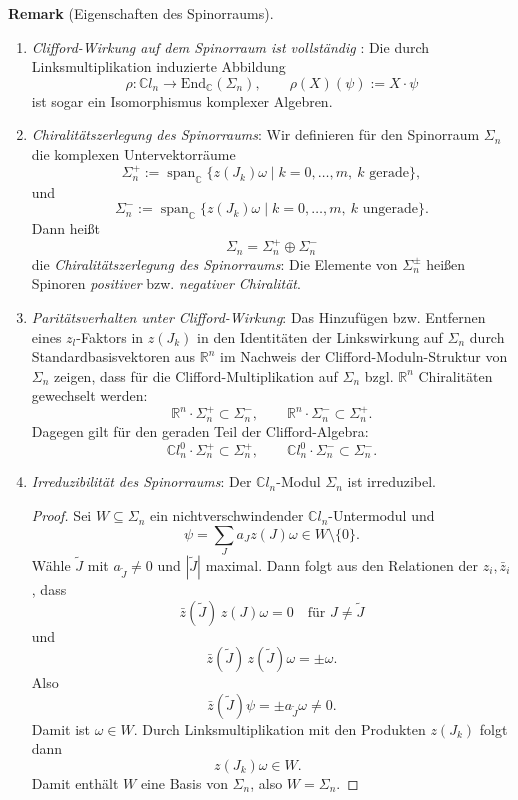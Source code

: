 \documentclass[10pt, letterpaper]{article}
\newcommand{\R}{\mathbb{R}}
\newcommand{\C}{\mathbb{C}}
\newcommand{\End}{\mathrm{End}}
\newcommand{\CustomHeading}[3]{%
  \par\medskip\noindent%
  \textbf{#1 #2} \textnormal{(#3)}.\enskip%
}
\newenvironment{REM}[2]{\CustomHeading{Remark}{#1}{#2}}{}
\begin{document}
\begin{REM}{}{Eigenschaften des Spinorraums}
\begin{enumerate}
    \item \emph{Clifford-Wirkung auf dem Spinorraum ist vollständig} \parencite[90]{BaerSpin}:
    Die durch Linksmultiplikation induzierte Abbildung
    \[
    \rho:\C l_n\longrightarrow \End_{\C}(\Sigma_n),\qquad
    \rho(X)(\psi):=X\cdot \psi
    \]
    ist sogar ein Isomorphismus komplexer Algebren.
    \item \emph{Chiralitätszerlegung des Spinorraums}:
    Wir definieren für den Spinorraum $\Sigma_n$ die komplexen Untervektorräume
    \[\Sigma_n^{+}:=\operatorname{span}_{\C}\{z(J_k)\omega\mid k=0,\dots,m,\ k \text{ gerade}\},\]
    und
    \[\Sigma_n^{-}:=\operatorname{span}_{\C}\{z(J_k)\omega\mid k=0,\dots,m,\ k \text{ ungerade}\}.\]
    Dann heißt
    \[\Sigma_n=\Sigma_n^{+}\oplus \Sigma_n^{-}\]
    die \emph{Chiralitätszerlegung des Spinorraums}: Die Elemente von $\Sigma_n^\pm$
    heißen Spinoren \emph{positiver} bzw. \emph{negativer Chiralität}.
    \item \emph{Paritätsverhalten unter Clifford-Wirkung}:
    Das Hinzufügen bzw. Entfernen eines $z_l$-Faktors in $z(J_k)$ in den Identitäten der Linkswirkung auf $\Sigma_n$ durch Standardbasisvektoren aus $\R^n$ im Nachweis der Clifford-Moduln-Struktur von $\Sigma_n$ zeigen, dass für die Clifford-Multiplikation auf $\Sigma_n$ bzgl. $\R^n$ Chiralitäten gewechselt werden:
    \[
    \R^n\cdot \Sigma_n^+ \subset \Sigma_n^-,
    \qquad
    \R^n\cdot \Sigma_n^- \subset \Sigma_n^+.
    \]
    Dagegen gilt für den geraden Teil der Clifford-Algebra:
    \[
    \C l_n^0\cdot \Sigma_n^+ \subset \Sigma_n^+,
    \qquad
    \C l_n^0\cdot \Sigma_n^- \subset \Sigma_n^-.
    \]
    \item \emph{Irreduzibilität des Spinorraums}:
    Der \(\C l_n\)-Modul \(\Sigma_n\) ist irreduzibel.

    \begin{proof}
    Sei \(W\subseteq \Sigma_n\) ein nichtverschwindender \(\C l_n\)-Untermodul
    und
    \[
    \psi=\sum_J a_J z(J)\omega \in W\setminus\{0\}.
    \]
    Wähle \(\tilde J\) mit \(a_{\tilde J}\neq 0\) und \(|\tilde J|\) maximal.
    Dann folgt aus den Relationen der \(z_i,\bar z_i\), dass
    \[
    \bar z(\tilde J)\, z(J)\omega = 0 \quad \text{für } J\neq \tilde J
    \]
    und
    \[
    \bar z(\tilde J)\, z(\tilde J)\omega = \pm \omega.
    \]
    Also
    \[
    \bar z(\tilde J)\psi = \pm a_{\tilde J}\omega \neq 0.
    \]
    Damit ist $\omega \in W$. Durch Linksmultiplikation mit den Produkten \(z(J_k)\) folgt dann \[ z(J_k)\omega\in W. \qquad \] Damit enthält \(W\) eine Basis von \(\Sigma_n\), also \(W=\Sigma_n\).
    \end{proof}
\end{enumerate}
\end{REM}
\end{document}

